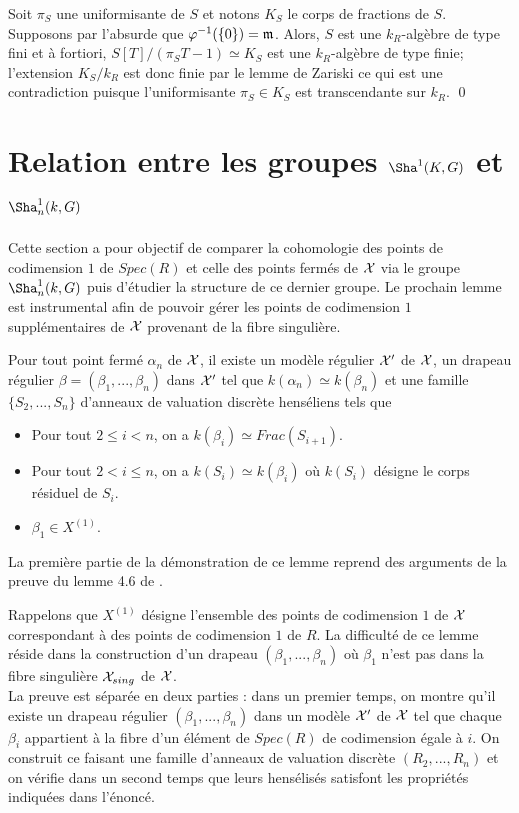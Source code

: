 \documentclass[11pt]{article}
\begin{document}
\proof Soit $\pi_S$ une uniformisante de $S$ et notons $K_S$ le corps de fractions de $S$. Supposons par l'absurde que $\varphi^{-1}(\{0\}) = \mathfrak{m} $. Alors, $S$ est une $k_R$-algèbre de type fini et à fortiori, $S[T]/(\pi_ST-1) \simeq K_S$ est une $k_R$-algèbre de type finie; l'extension $K_S/k_R$ est donc finie par le lemme de Zariski ce qui est une contradiction puisque l'uniformisante $\pi_S \in K_S$ est transcendante sur $k_R$. \qed \\

\section{Relation entre les groupes $\Sha^1(K,G)$ et $\Sha^1_n(k,G)$}
Cette section a pour objectif de comparer la cohomologie des points de codimension $1$ de $Spec(R)$ et celle des points fermés de $\mathcal{X}$ via le groupe $\Sha^1_n(k,G)$ puis d'étudier la structure de ce dernier groupe.
Le prochain lemme est instrumental afin de pouvoir gérer les points de codimension $1$ supplémentaires de $\mathcal{X}$ provenant de la fibre singulière.

\begin{lemme}\label{lemdrapeau}
Pour tout point fermé $\alpha_n$ de $\mathcal{X}$, il existe un modèle régulier $\mathcal{X}'$ de $\mathcal{X}$, un drapeau régulier $\beta = (\beta_1,...,\beta_n)$ dans $\mathcal{X}'$ tel que $k(\alpha_n) \simeq k(\beta_n)$ et une famille $\{S_2,...,S_n\}$ d'anneaux de valuation discrète henséliens tels que 
\begin{itemize}
    \item Pour tout $2\leq i < n$, on a  $k(\beta_i) \simeq Frac(S_{i+1})$.
    \item  Pour tout $2 < i \leq n$, on a $k(S_i) \simeq k(\beta_i)$ où $k(S_i)$ désigne le corps résiduel de $S_i$.
    \item $\beta_1 \in X^{(1)}$.
\end{itemize}

\end{lemme}

La première partie de la démonstration de ce lemme reprend des arguments de la preuve du lemme 4.6 de \cite{Wittenberg}.

\proof

Rappelons que $X^{(1)}$ désigne l'ensemble des points de codimension $1$ de $\mathcal{X}$ correspondant à des points de codimension $1$ de $R$. La difficulté de ce lemme réside dans la construction d'un drapeau $(\beta_1,...,\beta_n)$ où $\beta_1$ n'est pas dans la fibre singulière $\mathcal{X}_{sing}$ de $\mathcal{X}$.\\
La preuve est séparée en deux parties : dans un premier temps, on montre qu'il existe un drapeau régulier $(\beta_1,...,\beta_n)$ dans un modèle $\mathcal{X}'$ de $\mathcal{X}$ tel que chaque $\beta_i$ appartient à la fibre d'un élément de $Spec(R)$ de codimension égale à $i$. On construit ce faisant une famille d'anneaux de valuation discrète $(R_2,...,R_n)$ et on vérifie dans un second temps que leurs hensélisés satisfont les propriétés indiquées dans l'énoncé.\\ 
\end{document}
